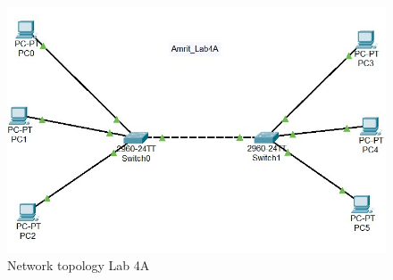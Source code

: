 \documentclass[a4paper,11pt]{article}
\begin{document}
\begin{figure}[H]
      \centering
      \includegraphics[scale=0.80,cframe=blue 0.5pt 3pt]{Lab4A.jpg}
      \caption{Network topology Lab 4A}
\end{figure}
\end{document}
